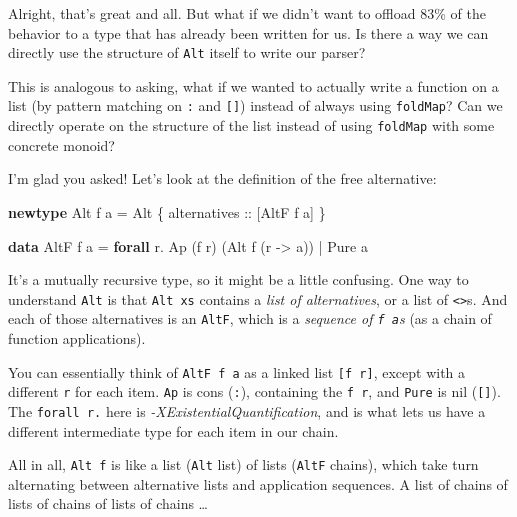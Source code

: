 \documentclass[]{article}
\newenvironment{Shaded}{}{}
\newcommand{\DataTypeTok}[1]{\textcolor[rgb]{0.56,0.13,0.00}{#1}}
\newcommand{\FunctionTok}[1]{\textcolor[rgb]{0.02,0.16,0.49}{#1}}
\newcommand{\KeywordTok}[1]{\textcolor[rgb]{0.00,0.44,0.13}{\textbf{#1}}}
\newcommand{\NormalTok}[1]{#1}
\newcommand{\OtherTok}[1]{\textcolor[rgb]{0.00,0.44,0.13}{#1}}
\begin{document}
Alright, that's great and all. But what if we didn't want to offload 83\% of the
behavior to a type that has already been written for us. Is there a way we can
directly use the structure of \texttt{Alt} itself to write our parser?

This is analogous to asking, what if we wanted to actually write a function on a
list (by pattern matching on \texttt{:} and \texttt{{[}{]}}) instead of always
using \texttt{foldMap}? Can we directly operate on the structure of the list
instead of using \texttt{foldMap} with some concrete monoid?

I'm glad you asked! Let's look at the definition of the free alternative:

\begin{Shaded}
\begin{Highlighting}[]
\KeywordTok{newtype} \DataTypeTok{Alt}\NormalTok{ f a }\FunctionTok{=} \DataTypeTok{Alt}\NormalTok{ \{}\OtherTok{ alternatives ::}\NormalTok{ [}\DataTypeTok{AltF}\NormalTok{ f a] \}}

\KeywordTok{data} \DataTypeTok{AltF}\NormalTok{ f a }\FunctionTok{=} \KeywordTok{forall}\NormalTok{ r}\FunctionTok{.} \DataTypeTok{Ap}\NormalTok{ (f r) (}\DataTypeTok{Alt}\NormalTok{ f (r }\OtherTok{->}\NormalTok{ a))}
              \FunctionTok{|}           \DataTypeTok{Pure}\NormalTok{ a}
\end{Highlighting}
\end{Shaded}

It's a mutually recursive type, so it might be a little confusing. One way to
understand \texttt{Alt} is that \texttt{Alt\ xs} contains a \emph{list of
alternatives}, or a list of \texttt{\textless{}\textbar{}\textgreater{}}s. And
each of those alternatives is an \texttt{AltF}, which is a \emph{sequence of
\texttt{f\ a}s} (as a chain of function applications).

You can essentially think of \texttt{AltF\ f\ a} as a linked list
\texttt{{[}f\ r{]}}, except with a different \texttt{r} for each item.
\texttt{Ap} is cons (\texttt{:}), containing the \texttt{f\ r}, and
\texttt{Pure} is nil (\texttt{{[}{]}}). The \texttt{forall\ r.} here is
\emph{-XExistentialQuantification}, and is what lets us have a different
intermediate type for each item in our chain.

All in all, \texttt{Alt\ f} is like a list (\texttt{Alt} list) of lists
(\texttt{AltF} chains), which take turn alternating between alternative lists
and application sequences. A list of chains of lists of chains of lists of
chains \ldots{}
\end{document}
